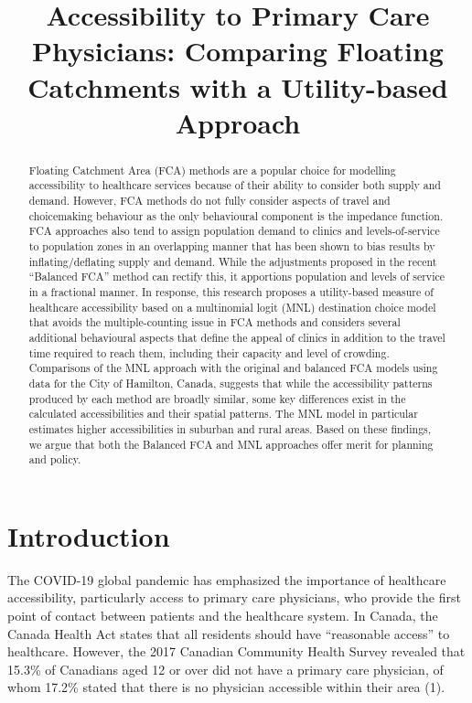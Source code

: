 \documentclass{article}
\title{Accessibility to Primary Care Physicians: Comparing Floating
Catchments with a Utility-based Approach}
\author{
  }
\begin{document}
\maketitle

\def\tightlist{}


\begin{abstract}
Floating Catchment Area (FCA) methods are a popular choice for modelling
accessibility to healthcare services because of their ability to
consider both supply and demand. However, FCA methods do not fully
consider aspects of travel and choicemaking behaviour as the only
behavioural component is the impedance function. FCA approaches also
tend to assign population demand to clinics and levels-of-service to
population zones in an overlapping manner that has been shown to bias
results by inflating/deflating supply and demand. While the adjustments
proposed in the recent ``Balanced FCA'' method can rectify this, it
apportions population and levels of service in a fractional manner. In
response, this research proposes a utility-based measure of healthcare
accessibility based on a multinomial logit (MNL) destination choice
model that avoids the multiple-counting issue in FCA methods and
considers several additional behavioural aspects that define the appeal
of clinics in addition to the travel time required to reach them,
including their capacity and level of crowding. Comparisons of the MNL
approach with the original and balanced FCA models using data for the
City of Hamilton, Canada, suggests that while the accessibility patterns
produced by each method are broadly similar, some key differences exist
in the calculated accessibilities and their spatial patterns. The MNL
model in particular estimates higher accessibilities in suburban and
rural areas. Based on these findings, we argue that both the Balanced
FCA and MNL approaches offer merit for planning and policy.
\end{abstract}


\hypertarget{introduction}{%
\section{Introduction}\label{introduction}}

The COVID-19 global pandemic has emphasized the importance of healthcare
accessibility, particularly access to primary care physicians, who
provide the first point of contact between patients and the healthcare
system. In Canada, the Canada Health Act states that all residents
should have ``reasonable access'' to healthcare. However, the 2017
Canadian Community Health Survey revealed that 15.3\% of Canadians aged
12 or over did not have a primary care physician, of whom 17.2\% stated
that there is no physician accessible within their area (1).
\end{document}
